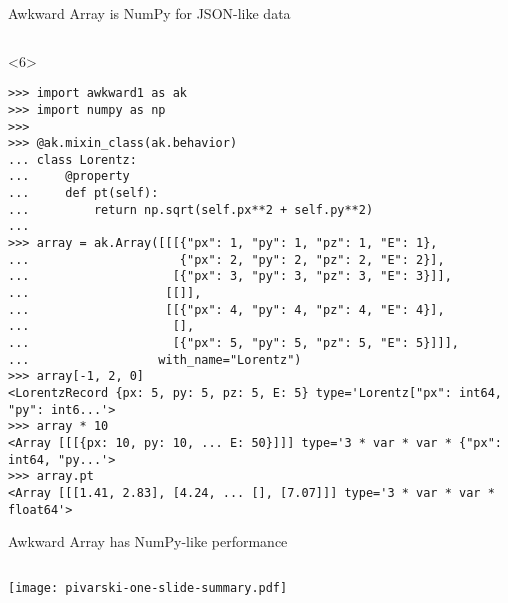 \documentclass[aspectratio=169]{beamer}
\begin{document}
\begin{frame}[fragile]{Awkward Array is NumPy for JSON-like data}
\begin{onlyenv}
\begin{verbatim}
\end{verbatim}
\vspace{3 cm}
\end{onlyenv}
\begin{onlyenv}<6>
\begin{verbatim}
>>> import awkward1 as ak
>>> import numpy as np
>>> 
>>> @ak.mixin_class(ak.behavior)
... class Lorentz:
...     @property
...     def pt(self):
...         return np.sqrt(self.px**2 + self.py**2)
... 
>>> array = ak.Array([[[{"px": 1, "py": 1, "pz": 1, "E": 1},
...                     {"px": 2, "py": 2, "pz": 2, "E": 2}],
...                    [{"px": 3, "py": 3, "pz": 3, "E": 3}]],
...                   [[]],
...                   [[{"px": 4, "py": 4, "pz": 4, "E": 4}],
...                    [],
...                    [{"px": 5, "py": 5, "pz": 5, "E": 5}]]],
...                  with_name="Lorentz")
>>> array[-1, 2, 0]
<LorentzRecord {px: 5, py: 5, pz: 5, E: 5} type='Lorentz["px": int64, "py": int6...'>
>>> array * 10
<Array [[[{px: 10, py: 10, ... E: 50}]]] type='3 * var * var * {"px": int64, "py...'>
>>> array.pt
<Array [[[1.41, 2.83], [4.24, ... [], [7.07]]] type='3 * var * var * float64'>
\end{verbatim}
\vspace{3 cm}
\end{onlyenv}
\end{frame}

\begin{frame}{Awkward Array has NumPy-like performance}
\vspace{0.2 cm}
\begin{columns}
\texttt{[image: pivarski-one-slide-summary.pdf]}
\end{columns}
\end{frame}
\end{document}
